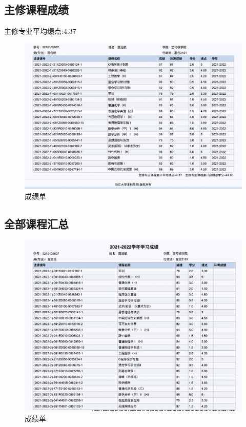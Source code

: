 \documentclass{article}
\begin{document}
\subsection*{主修课程成绩}
主修专业平均绩点:4.37
    \begin{figure}[H]
    \centering
    \includegraphics[width=1\textwidth]{4.png}
    \caption{\label{总结}成绩单}
    \end{figure}

\subsection*{全部课程汇总}
    \begin{figure}[H]
    \centering
    \includegraphics[width=1\textwidth]{5.png}
    \caption{\label{总结}成绩单}
    \end{figure}
\end{document}
